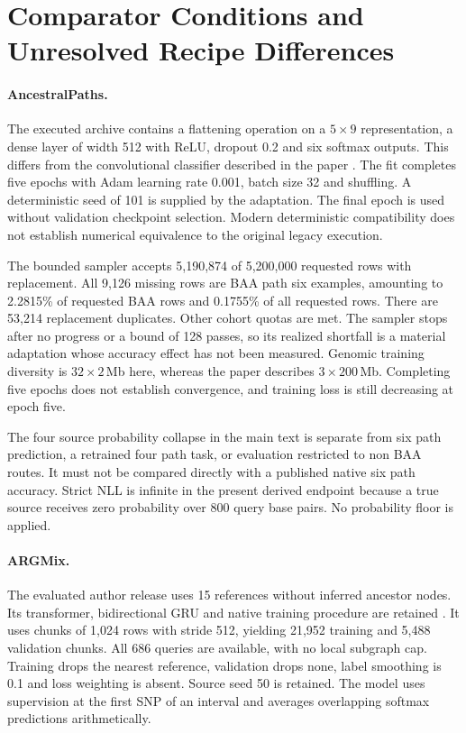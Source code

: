 \documentclass[letterpaper]{article}
\begin{document}
\section{Comparator Conditions and Unresolved Recipe Differences}
\label{app:comparators}
\paragraph{AncestralPaths.}
The executed archive contains a flattening operation on a $5\times9$ representation, a dense layer of width 512 with ReLU, dropout 0.2 and six softmax outputs. This differs from the convolutional classifier described in the paper \citep{eurasians2024}. The fit completes five epochs with Adam learning rate 0.001, batch size 32 and shuffling. A deterministic seed of 101 is supplied by the adaptation. The final epoch is used without validation checkpoint selection. Modern deterministic compatibility does not establish numerical equivalence to the original legacy execution.

The bounded sampler accepts 5,190,874 of 5,200,000 requested rows with replacement. All 9,126 missing rows are BAA path six examples, amounting to 2.2815\% of requested BAA rows and 0.1755\% of all requested rows. There are 53,214 replacement duplicates. Other cohort quotas are met. The sampler stops after no progress or a bound of 128 passes, so its realized shortfall is a material adaptation whose accuracy effect has not been measured. Genomic training diversity is $32\times2$\,Mb here, whereas the paper describes $3\times200$\,Mb. Completing five epochs does not establish convergence, and training loss is still decreasing at epoch five.

The four source probability collapse in the main text is separate from six path prediction, a retrained four path task, or evaluation restricted to non BAA routes. It must not be compared directly with a published native six path accuracy. Strict NLL is infinite in the present derived endpoint because a true source receives zero probability over 800 query base pairs. No probability floor is applied.

\paragraph{ARGMix.}
The evaluated author release uses 15 references without inferred ancestor nodes. Its transformer, bidirectional GRU and native training procedure are retained \citep{ancientancestry2026}. It uses chunks of 1,024 rows with stride 512, yielding 21,952 training and 5,488 validation chunks. All 686 queries are available, with no local subgraph cap. Training drops the nearest reference, validation drops none, label smoothing is 0.1 and loss weighting is absent. Source seed 50 is retained. The model uses supervision at the first SNP of an interval and averages overlapping softmax predictions arithmetically.
\end{document}
